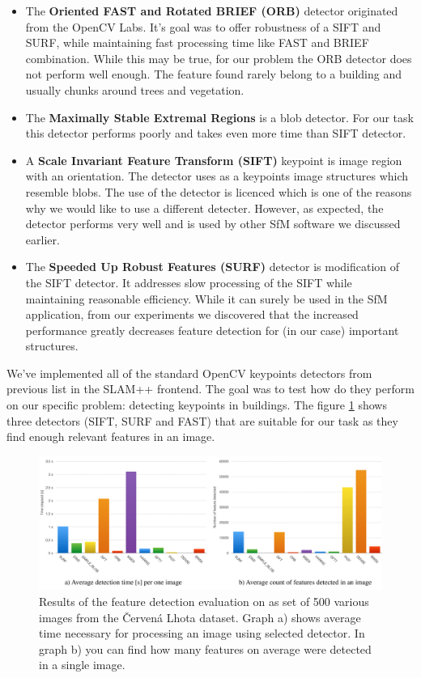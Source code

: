 \begin{itemize}
	\item The \textbf{Oriented FAST and Rotated BRIEF (ORB)} detector originated from the OpenCV Labs. It's goal was to offer robustness of a SIFT and SURF, while maintaining fast processing time like FAST and BRIEF combination. While this may be true, for our problem the ORB detector does not perform well enough. The feature found rarely belong to a building and usually chunks around trees and vegetation. \cite{www:orb}\cite{article:orb}
	
	\item The \textbf{Maximally Stable Extremal Regions} is a blob detector. For our task this detector performs poorly and takes even more time than SIFT detector.
	
	\item A \textbf{Scale Invariant Feature Transform (SIFT)} keypoint is image region with an orientation. The detector uses as a keypoints image structures  which resemble blobs. The use of the detector is licenced which is one of the reasons why we would like to use a different detecter. However, as expected, the detector performs very well and is used by other SfM software we discussed earlier. \cite{article:sift}
	
	\item The \textbf{Speeded Up Robust Features (SURF)} detector is modification of the SIFT detector. It addresses slow processing of the SIFT while maintaining reasonable efficiency. While it can surely be used in the SfM application, from our experiments we discovered that the increased performance greatly decreases feature detection for (in our case) important structures.  \cite{www:surf}
\end{itemize}

We've implemented all of the standard OpenCV keypoints detectors from previous list in the SLAM++ frontend. The goal was to test how do they perform on our specific problem: detecting keypoints in buildings. The figure \ref{fig:detectors} shows three detectors (SIFT, SURF and FAST) that are suitable for our task as they find enough relevant features in an image. 

\begin{figure}[ht]
	\begin{center}
		\includegraphics[keepaspectratio,width=\textwidth]{fig/detectors.pdf}
	\end{center}
	\caption{Results of the feature detection evaluation on as set of 500 various images from the Červená Lhota dataset. Graph a) shows average time necessary for processing an image using selected detector. In graph b) you can find how many features on average were detected in a single image.}
	\label{fig:detectors}
\end{figure}

